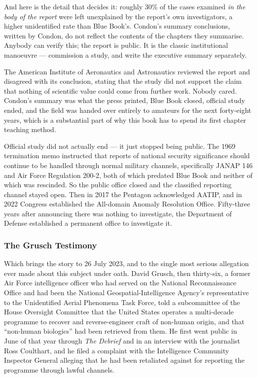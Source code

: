 And here is the detail that decides it: roughly 30\% of the cases examined \emph{in the body of
the report} were left unexplained by the report's own investigators, a higher unidentified rate
than Blue Book's. Condon's summary conclusions, written by Condon, do not reflect the contents
of the chapters they summarise. Anybody can verify this; the report is public. It is the
classic institutional manoeuvre --- commission a study, and write the executive summary
separately.

The American Institute of Aeronautics and Astronautics reviewed the report and disagreed with
its conclusion, stating that the study did not support the claim that nothing of scientific
value could come from further work. Nobody cared. Condon's summary was what the press printed,
Blue Book closed, official study ended, and the field was handed over entirely to amateurs for
the next forty-eight years, which is a substantial part of why this book has to spend its first
chapter teaching method.

\begin{funfact}
Official study did not actually end --- it just stopped being public. The 1969 termination
memo instructed that reports of national security significance should continue to be handled
through normal military channels, specifically JANAP 146 and Air Force Regulation 200-2, both
of which predated Blue Book and neither of which was rescinded. So the public office closed and
the classified reporting channel stayed open. Then in 2017 the Pentagon acknowledged AATIP, and
in 2022 Congress established the All-domain Anomaly Resolution Office. Fifty-three years after
announcing there was nothing to investigate, the Department of Defense established a permanent
office to investigate it.
\end{funfact}

\subsubsection{The Grusch Testimony}\label{sec:grusch}

Which brings the story to 26 July 2023, and to the single most serious allegation ever made about
this subject under oath. David Grusch, then thirty-six, a former Air Force intelligence officer who
had served on the National Reconnaissance Office and had been the National Geospatial-Intelligence
Agency's representative to the Unidentified Aerial Phenomena Task Force, told a subcommittee of the
House Oversight Committee that the United States operates a multi-decade programme to recover and
reverse-engineer craft of non-human origin, and that ``non-human biologics'' had been retrieved
from them. He first went public in June of that year through \emph{The Debrief} and in an interview
with the journalist Ross Coulthart, and he filed a complaint with the Intelligence Community
Inspector General alleging that he had been retaliated against for reporting the programme through
lawful channels.

